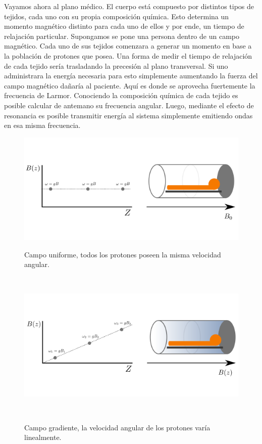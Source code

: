 Vayamos ahora al plano m\'edico. El cuerpo est\'a compuesto por distintos 
tipos de tejidos, cada uno con su propia composici\'on qu\'imica. Esto 
determina un momento magn\'etico distinto para cada uno de ellos y por
ende, un tiempo de relajaci\'on particular. Supongamos se pone una persona
dentro de un campo magn\'etico. Cada uno de sus tejidos comenzara a 
generar un momento en base a la poblaci\'on de protones que posea. 
Una forma de medir el tiempo de relajaci\'on de cada tejido ser\'ia
trasladando la precesi\'on al plano transversal. Si uno administrara 
la energ\'ia necesaria para esto simplemente aumentando la fuerza del
campo magn\'etico
da\~nar\'ia al paciente. Aqu\'i es donde se aprovecha fuertemente la
frecuencia de Larmor. Conociendo la composici\'on qu\'imica de cada tejido
es posible calcular de antemano su frecuencia angular. Luego, mediante el
efecto de resonancia es posible transmitir energ\'ia al sistema
simplemente emitiendo ondas en esa misma frecuencia. \\

\begin{figure}[h!]
                                                                                                                        
\begin{minipage}[b]{0.49\textwidth}
    \includegraphics[width=\textwidth]{img/grad0.png}
    \caption{\small  Campo uniforme, todos los protones poseen la misma velocidad angular.}
     \label{fig:unif}
\end{minipage} ~
\hfill
\begin{minipage}[b]{0.49\textwidth}
    \includegraphics[width=\textwidth]{img/grad1.png}
    \caption{\small Campo gradiente, la velocidad angular de los protones var\'ia linealmente. }
    \label{fig:grad}
\end{minipage} ~

\end{figure}  


